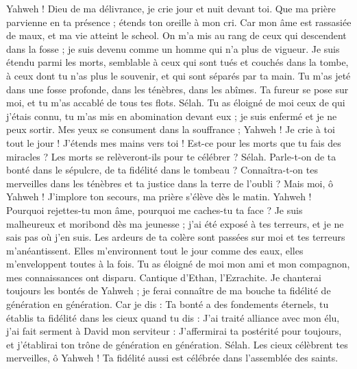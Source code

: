 \begin{multicols}{2}
Yahweh ! Dieu de ma délivrance, je crie jour et nuit devant toi.
Que ma prière parvienne en ta présence ; étends ton oreille à mon cri.
Car mon âme est rassasiée de maux, et ma vie atteint le scheol.
On m'a mis au rang de ceux qui descendent dans la fosse ; je suis devenu comme un homme qui n'a plus de vigueur.
Je suis étendu parmi les morts, semblable à ceux qui sont tués et couchés dans la tombe, à ceux dont tu n'as plus le souvenir, et qui sont séparés par ta main.
Tu m'as jeté dans une fosse profonde, dans les ténèbres, dans les abîmes.
Ta fureur se pose sur moi, et tu m'as accablé de tous tes flots. Sélah.
Tu as éloigné de moi ceux de qui j'étais connu, tu m'as mis en abomination devant eux ; je suis enfermé et je ne peux sortir.
Mes yeux se consument dans la souffrance ; Yahweh ! Je crie à toi tout le jour ! J'étends mes mains vers toi !
Est-ce pour les morts que tu fais des miracles ? Les morts se relèveront-ils pour te célébrer ? Sélah.
Parle-t-on de ta bonté dans le sépulcre, de ta fidélité dans le tombeau ?
Connaîtra-t-on tes merveilles dans les ténèbres et ta justice dans la terre de l'oubli ?
Mais moi, ô Yahweh ! J'implore ton secours, ma prière s'élève dès le matin.
Yahweh ! Pourquoi rejettes-tu mon âme, pourquoi me caches-tu ta face ?
Je suis malheureux et moribond dès ma jeunesse ; j'ai été exposé à tes terreurs, et je ne sais pas où j'en suis.
Les ardeurs de ta colère sont passées sur moi et tes terreurs m'anéantissent.
Elles m'environnent tout le jour comme des eaux, elles m'enveloppent toutes à la fois.
Tu as éloigné de moi mon ami et mon compagnon, mes connaissances ont disparu.
\VerseOne{}Cantique d'Ethan, l'Ezrachite.
Je chanterai toujours les bontés de Yahweh ; je ferai connaître de ma bouche ta fidélité de génération en génération.
Car je dis : Ta bonté a des fondements éternels, tu établis ta fidélité dans les cieux quand tu dis :
J'ai traité alliance avec mon élu, j'ai fait serment à David mon serviteur :
J'affermirai ta postérité pour toujours, et j'établirai ton trône de génération en génération. Sélah.
Les cieux célèbrent tes merveilles, ô Yahweh ! Ta fidélité aussi est célébrée dans l'assemblée des saints.

\end{multicols}
